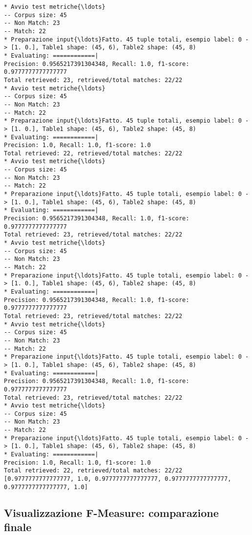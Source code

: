 \documentclass[11pt]{article}
\begin{document}
    \begin{Verbatim}[commandchars=\\\{\}]
* Avvio test metriche{\ldots}
-- Corpus size: 45
-- Non Match: 23
-- Match: 22
* Preparazione input{\ldots}Fatto. 45 tuple totali, esempio label: 0 -> [1. 0.], Table1 shape: (45, 6), Table2 shape: (45, 8)
* Evaluating: ============|
Precision: 0.9565217391304348, Recall: 1.0, f1-score: 0.9777777777777777
Total retrieved: 23, retrieved/total matches: 22/22
* Avvio test metriche{\ldots}
-- Corpus size: 45
-- Non Match: 23
-- Match: 22
* Preparazione input{\ldots}Fatto. 45 tuple totali, esempio label: 0 -> [1. 0.], Table1 shape: (45, 6), Table2 shape: (45, 8)
* Evaluating: ============|
Precision: 1.0, Recall: 1.0, f1-score: 1.0
Total retrieved: 22, retrieved/total matches: 22/22
* Avvio test metriche{\ldots}
-- Corpus size: 45
-- Non Match: 23
-- Match: 22
* Preparazione input{\ldots}Fatto. 45 tuple totali, esempio label: 0 -> [1. 0.], Table1 shape: (45, 6), Table2 shape: (45, 8)
* Evaluating: ============|
Precision: 0.9565217391304348, Recall: 1.0, f1-score: 0.9777777777777777
Total retrieved: 23, retrieved/total matches: 22/22
* Avvio test metriche{\ldots}
-- Corpus size: 45
-- Non Match: 23
-- Match: 22
* Preparazione input{\ldots}Fatto. 45 tuple totali, esempio label: 0 -> [1. 0.], Table1 shape: (45, 6), Table2 shape: (45, 8)
* Evaluating: ============|
Precision: 0.9565217391304348, Recall: 1.0, f1-score: 0.9777777777777777
Total retrieved: 23, retrieved/total matches: 22/22
* Avvio test metriche{\ldots}
-- Corpus size: 45
-- Non Match: 23
-- Match: 22
* Preparazione input{\ldots}Fatto. 45 tuple totali, esempio label: 0 -> [1. 0.], Table1 shape: (45, 6), Table2 shape: (45, 8)
* Evaluating: ============|
Precision: 0.9565217391304348, Recall: 1.0, f1-score: 0.9777777777777777
Total retrieved: 23, retrieved/total matches: 22/22
* Avvio test metriche{\ldots}
-- Corpus size: 45
-- Non Match: 23
-- Match: 22
* Preparazione input{\ldots}Fatto. 45 tuple totali, esempio label: 0 -> [1. 0.], Table1 shape: (45, 6), Table2 shape: (45, 8)
* Evaluating: ============|
Precision: 1.0, Recall: 1.0, f1-score: 1.0
Total retrieved: 22, retrieved/total matches: 22/22
[0.9777777777777777, 1.0, 0.9777777777777777, 0.9777777777777777, 0.9777777777777777, 1.0]

    \end{Verbatim}

    \subsection{Visualizzazione F-Measure: comparazione
finale}\label{visualizzazione-f-measure-comparazione-finale}
\end{document}
